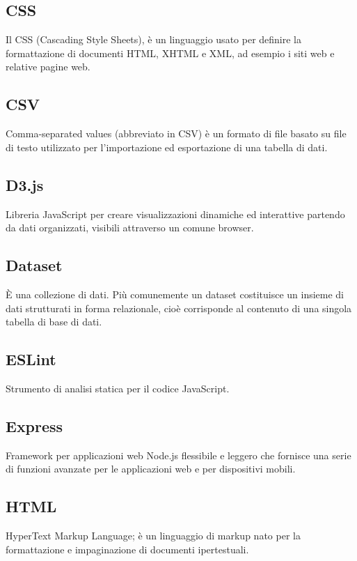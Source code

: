 \documentclass[../manuale_sviluppatore.tex]{subfiles}
\begin{document}
\subsection*{CSS}
{}
Il CSS (Cascading Style Sheets), è un linguaggio usato per definire la formattazione di documenti HTML, XHTML e XML, ad esempio i siti web e relative pagine web.

\subsection*{CSV}
{}
Comma-separated values (abbreviato in CSV) è un formato di file basato su file di testo utilizzato per l'importazione ed esportazione di una tabella di dati.

\subsection*{D3.js}
{}
Libreria JavaScript per creare visualizzazioni dinamiche ed interattive partendo da dati organizzati, visibili attraverso un comune browser.

\subsection*{Dataset}
{}
È una collezione di dati. Più comunemente un dataset costituisce un insieme di dati strutturati in forma relazionale, cioè corrisponde al contenuto di una singola tabella di base di dati.

\subsection*{ESLint}
{}
Strumento di analisi statica per il codice JavaScript.

\subsection*{Express}
{}
Framework per applicazioni web Node.js flessibile e leggero che fornisce una serie di funzioni avanzate per le applicazioni web e per dispositivi mobili.

\subsection*{HTML}
{}
HyperText Markup Language; è un linguaggio di markup nato per la formattazione e impaginazione di documenti ipertestuali.
\end{document}
